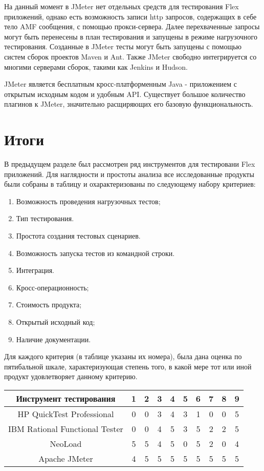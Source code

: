 На данный момент в JMeter нет отдельных средств для тестирования Flex приложений, 
однако есть возможность записи http запросов, содержащих в себе тело AMF 
сообщения, с помощью прокси-сервера. Далее перехваченные запросы могут быть 
перенесены в план тестирования и запущены в режиме нагрузочного тестирования. 
Созданные в JMeter тесты могут быть запущены с помощью систем сборок проектов Maven и 
Ant. Также JMeter свободно интегрируется со многими серверами сборок, такими как Jenkins 
и Hudson.

JMeter является бесплатным кросс-платформенным Java - приложением с открытым 
исходным кодом и удобным API. Существует большое количество плагинов к JMeter, 
значительно расщиряющих его базовую функциональность.  

\section*{Итоги}
В предыдущем разделе был рассмотрен ряд инструментов для тестировани Flex приложений.
Для наглядности и простоты анализа все исследованные продукты были собраны в таблицу и 
охарактеризованы по следующему набору критериев:

\begin{enumerate}
\item Возможность проведения нагрузочных тестов; 
\item Тип тестирования. 
\item Простота создания тестовых сценариев.
\item Возможность запуска тестов из командной строки.
\item Интеграция. 
\item Кросс-операционность; 
\item Стоимость продукта;
\item Открытый исходный код;
\item Наличие документации. 
\end{enumerate}

Для каждого критерия (в таблице указаны их номера), была дана оценка по пятибальной шкале, 
характеризующая степень того, в какой мере тот или иной продукт удовлетворяет данному критерию.

\begin{tabular}{|c|c|c|c|c|c|c|c|c|c|}
\hline 
Инструмент тестирования & 1 & 2 & 3 & 4 & 5 & 6 & 7 & 8 & 9\\ 
\hline 
HP QuickTest Professional & 0 & 0 & 3 & 4 & 3 & 1 & 0 & 0 & 5\\ 
\hline 
IBM Rational Functional Tester & 0 & 0 & 4 & 5 & 3 & 5 & 2 & 2 & 5\\ 
\hline 
NeoLoad & 5 & 5 & 4 & 5 & 0 & 5 & 2 & 0 & 4\\ 
\hline 
Apache JMeter & 4 & 5 & 5 & 5 & 5 & 5 & 5 & 5 & 5\\ 
\hline 
\end{tabular} 


